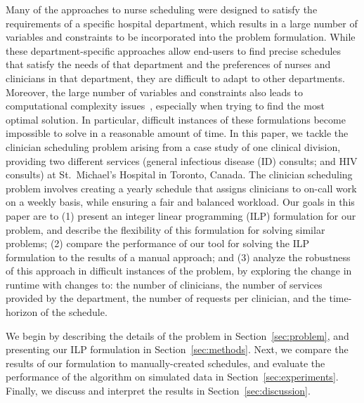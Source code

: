 Many of the approaches to nurse scheduling were designed to satisfy the
requirements of a specific hospital department, which results in a large number of
variables and constraints to be incorporated into the problem formulation. While
these department-specific approaches allow end-users to find precise schedules
that satisfy the needs of that department and the preferences of nurses and
clinicians in that department, they are difficult to adapt to other
departments.
Moreover, the large number of variables and constraints also leads to
computational complexity issues~\cite{goos_complexity_1996}, especially when
trying to find the most optimal solution. In particular, difficult instances of these formulations
become impossible to solve in a reasonable amount of time. 
In this paper, we tackle the clinician 
scheduling problem arising from a case study of one clinical
division, providing two different services (general infectious
disease (ID) consults; and HIV consults) at St.\ Michael's Hospital in
Toronto, Canada. The clinician scheduling problem involves creating
a yearly schedule that assigns clinicians to on-call work on a weekly basis,
while ensuring a fair and balanced workload.
Our goals in this paper are to (1) present an integer linear programming 
(ILP) formulation for our problem, and
describe the flexibility of this formulation for solving similar problems;
(2) compare the performance of our tool for solving the ILP formulation to the
results of a manual approach; 
and (3) analyze the robustness of this approach
in difficult instances of the problem, by exploring the change in runtime with
changes to:
the number of clinicians,
the number of services provided by the department,
the number of requests per clinician, and
the time-horizon of the schedule.

We begin by describing the details of the problem in Section~\ref{sec:problem}, and presenting
our ILP formulation in Section~\ref{sec:methods}. Next, we compare the results
of our formulation to manually-created schedules, and evaluate the performance
of the algorithm on simulated data in Section~\ref{sec:experiments}. Finally, we
discuss and interpret the results in Section~\ref{sec:discussion}.